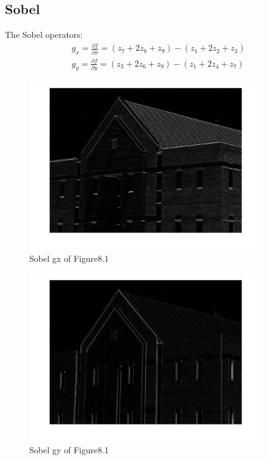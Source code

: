 \documentclass[11pt,oneside]{book}
\begin{document}
\subsection{Sobel}
The Sobel operators:
\begin{align}
g_x = \frac{\partial f}{\partial x} = (z_7+2z_8+z_9)-(z_1+2z_2+z_3)\\
g_y = \frac{\partial f}{\partial y} = (z_3+2z_6+z_9)-(z_1+2z_4+z_7)
\end{align}
\newpage
\begin{figure}[!htb]
   \centering  
   \includegraphics[width=0.9\textwidth]{images/9/sobel_x.jpg}
   \caption{Sobel gx of Figure8.1}
\end{figure}
\begin{figure}[!htb]
   \centering  
   \includegraphics[width=0.9\textwidth]{images/9/sobel_y.jpg}
   \caption{Sobel gy of Figure8.1}
\end{figure}
\newpage
\end{document}
